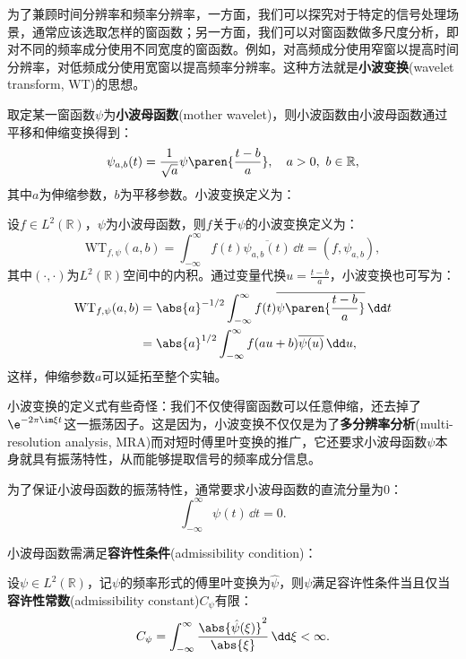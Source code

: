 为了兼顾时间分辨率和频率分辨率，一方面，我们可以探究对于特定的信号处理场景，通常应该选取怎样的窗函数；另一方面，我们可以对窗函数做多尺度分析，即对不同的频率成分使用不同宽度的窗函数。例如，对高频成分使用窄窗以提高时间分辨率，对低频成分使用宽窗以提高频率分辨率。这种方法就是\textbf{小波变换}(wavelet transform, WT)的思想。

取定某一窗函数$\psi$为\textbf{小波母函数}(mother wavelet)，则小波函数由小波母函数通过平移和伸缩变换得到：
\begin{equation}
    \psi_{a,b}(t)=\frac{1}{\sqrt{a}}\psi\paren{\frac{t-b}{a}},\quad a>0,\ b\in\mathbb{R},
\end{equation}
其中$a$为伸缩参数，$b$为平移参数。小波变换定义为：
\begin{definition}[小波变换]
    设$f\in L^2(\mathbb{R})$，$\psi$为小波母函数，则$f$关于$\psi$的小波变换定义为：
    \begin{equation}
        \mathrm{WT}_{f,\psi}(a,b)=\int_{-\infty}^{\infty}f(t)\overline{\psi_{a,b}(t)}\,\dd t=(f,\psi_{a,b}),
    \end{equation}
    其中$(\cdot,\cdot)$为$L^2(\mathbb{R})$空间中的内积。通过变量代换$\displaystyle u=\frac{t-b}{a}$，小波变换也可写为：
    \begin{align}
        \mathrm{WT}_{f,\psi}(a,b)&=\abs{a}^{-1/2}\int_{-\infty}^{\infty}f(t)\overline{\psi\paren{\frac{t-b}{a}}}\,\dd t\nonumber\\
        &=\abs{a}^{1/2}\int_{-\infty}^{\infty}f(au+b)\overline{\psi(u)}\,\dd u,
    \end{align}
    这样，伸缩参数$a$可以延拓至整个实轴。
\end{definition}

小波变换的定义式有些奇怪：我们不仅使得窗函数可以任意伸缩，还去掉了$\e^{-2\pi\im\xi t}$这一振荡因子。这是因为，小波变换不仅仅是为了\textbf{多分辨率分析}(multi-resolution analysis, MRA)而对短时傅里叶变换的推广，它还要求小波母函数$\psi$本身就具有振荡特性，从而能够提取信号的频率成分信息。

为了保证小波母函数的振荡特性，通常要求小波母函数的直流分量为$0$\cite{mathematics_in_signal_processing}：
\begin{equation}
    \int_{-\infty}^{\infty}\psi(t)\,\dd t=0.
\end{equation}

小波母函数需满足\textbf{容许性条件}(admissibility condition)：
\begin{definition}[容许性条件]
    设$\psi\in L^2(\mathbb{R})$，记$\psi$的频率形式的傅里叶变换为$\hat{\psi}$，则$\psi$满足容许性条件当且仅当\textbf{容许性常数}(admissibility constant)$C_{\psi}$有限：
    \begin{equation}
        C_{\psi}=\int_{-\infty}^{\infty}\frac{\abs{\hat{\psi}(\xi)}^2}{\abs{\xi}}\,\dd\xi<\infty.
    \end{equation}
\end{definition}

